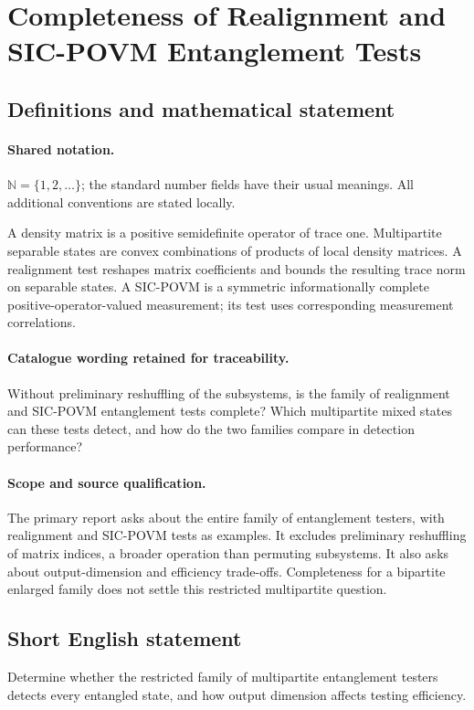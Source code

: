 \documentclass[11pt]{article}
\begin{document}
\section{Completeness of Realignment and SIC-POVM Entanglement Tests}\label{statement}

\subsection{Definitions and mathematical statement}

\paragraph{Shared notation.}$\mathbb N=\{1,2,\ldots\}$; the standard number fields have their usual meanings. All additional conventions are stated locally.


A density matrix is a positive semidefinite operator of trace one. Multipartite separable states are convex combinations of products of local density matrices. A realignment test reshapes matrix coefficients and bounds the resulting trace norm on separable states. A SIC-POVM is a symmetric informationally complete positive-operator-valued measurement; its test uses corresponding measurement correlations.

\paragraph{Catalogue wording retained for traceability.}
Without preliminary reshuffling of the subsystems, is the family of realignment and SIC-POVM entanglement tests complete? Which multipartite mixed states can these tests detect, and how do the two families compare in detection performance?

\paragraph{Scope and source qualification.}The primary report asks about the entire family of entanglement testers, with realignment and SIC-POVM tests as examples. It excludes preliminary reshuffling of matrix indices, a broader operation than permuting subsystems. It also asks about output-dimension and efficiency trade-offs. Completeness for a bipartite enlarged family does not settle this restricted multipartite question.
\subsection{Short English statement}
Determine whether the restricted family of multipartite entanglement testers detects every entangled state, and how output dimension affects testing efficiency.
\end{document}
